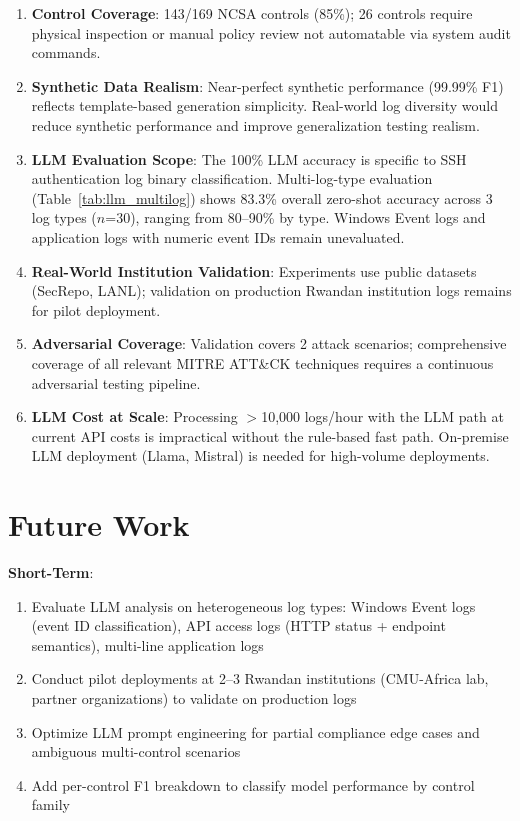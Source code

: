 \documentclass[11pt,conference]{IEEEtran}
\begin{document}
\begin{enumerate}
    \item \textbf{Control Coverage}: 143/169 NCSA controls (85\%); 26 controls require physical inspection or manual policy review not automatable via system audit commands.
    \item \textbf{Synthetic Data Realism}: Near-perfect synthetic performance (99.99\% F1) reflects template-based generation simplicity. Real-world log diversity would reduce synthetic performance and improve generalization testing realism.
    \item \textbf{LLM Evaluation Scope}: The 100\% LLM accuracy is specific to SSH authentication log binary classification. Multi-log-type evaluation (Table~\ref{tab:llm_multilog}) shows 83.3\% overall zero-shot accuracy across 3 log types ($n$=30), ranging from 80--90\% by type. Windows Event logs and application logs with numeric event IDs remain unevaluated.
    \item \textbf{Real-World Institution Validation}: Experiments use public datasets (SecRepo, LANL); validation on production Rwandan institution logs remains for pilot deployment.
    \item \textbf{Adversarial Coverage}: Validation covers 2 attack scenarios; comprehensive coverage of all relevant MITRE ATT\&CK techniques requires a continuous adversarial testing pipeline.
    \item \textbf{LLM Cost at Scale}: Processing $>$10,000 logs/hour with the LLM path at current API costs is impractical without the rule-based fast path. On-premise LLM deployment (Llama, Mistral) is needed for high-volume deployments.
\end{enumerate}

\section{Future Work}
\label{sec:future}

\textbf{Short-Term}:
\begin{enumerate}
    \item Evaluate LLM analysis on heterogeneous log types: Windows Event logs (event ID classification), API access logs (HTTP status + endpoint semantics), multi-line application logs
    \item Conduct pilot deployments at 2--3 Rwandan institutions (CMU-Africa lab, partner organizations) to validate on production logs
    \item Optimize LLM prompt engineering for partial compliance edge cases and ambiguous multi-control scenarios
    \item Add per-control F1 breakdown to classify model performance by control family
\end{enumerate}
\end{document}
